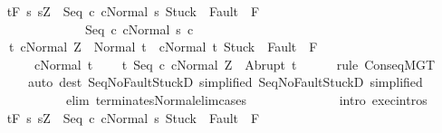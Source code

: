 \begin{isabellebody}
\ \ \isamarkupfalse%
\ {\isachardoublequoteopen}{\isasymGamma}{\isacharcomma}{\isasymTheta}{\isasymturnstile}\isactrlsub t\isactrlbsub {\isacharslash}F\isactrlesub \ {\isacharbraceleft}s{\isachardot}\ s{\isacharequal}Z\ {\isasymand}\ {\isasymGamma}{\isasymturnstile}{\isasymlangle}Seq\ c{}\ c{}{\isacharcomma}Normal\ s{\isasymrangle}\ {\isasymRightarrow}{\isasymnotin}{\isacharparenleft}{\isacharbraceleft}Stuck{\isacharbraceright}\ {\isasymunion}\ Fault\ {\isacharbackquote}\ {\isacharparenleft}{\isacharminus}F{\isacharparenright}{\isacharparenright}\ {\isasymand}\ \isanewline
\ \ \ \ \ \ \ \ \ \ \ \ \ \ \ \ {\isasymGamma}{\isasymturnstile}Seq\ c{}\ c{}{\isasymdown}Normal\ s{\isacharbraceright}\ c{}\ \isanewline
\ \ \ \ {\isacharbraceleft}t{\isachardot}\ {\isasymGamma}{\isasymturnstile}{\isasymlangle}c{}{\isacharcomma}Normal\ Z{\isasymrangle}\ {\isasymRightarrow}\ Normal\ t\ {\isasymand}\ {\isasymGamma}{\isasymturnstile}{\isasymlangle}c{}{\isacharcomma}Normal\ t{\isasymrangle}\ {\isasymRightarrow}{\isasymnotin}{\isacharparenleft}{\isacharbraceleft}Stuck{\isacharbraceright}\ {\isasymunion}\ Fault\ {\isacharbackquote}\ {\isacharparenleft}{\isacharminus}F{\isacharparenright}{\isacharparenright}\ {\isasymand}\ \isanewline
\ \ \ \ \ \ \ \ {\isasymGamma}{\isasymturnstile}c{}{\isasymdown}Normal\ t{\isacharbraceright}{\isacharcomma}\isanewline
\ \ \ \ {\isacharbraceleft}t{\isachardot}\ {\isasymGamma}{\isasymturnstile}{\isasymlangle}Seq\ c{}\ c{}{\isacharcomma}Normal\ Z{\isasymrangle}\ {\isasymRightarrow}\ Abrupt\ t{\isacharbraceright}{\isachardoublequoteclose}\isanewline
\ \ \ \ \isamarkupfalse%
\ {\isacharparenleft}rule\ ConseqMGT{\isacharparenright}\isanewline
\ \ \ \ \ \ \ {\isacharparenleft}auto\ dest{\isacharcolon}\ Seq{\isacharunderscore}NoFaultStuckD{}\ {\isacharbrackleft}simplified{\isacharbrackright}\ Seq{\isacharunderscore}NoFaultStuckD{}\ {\isacharbrackleft}simplified{\isacharbrackright}\isanewline
\ \ \ \ \ \ \ \ \ \ \ \ \ elim{\isacharcolon}\ terminates{\isacharunderscore}Normal{\isacharunderscore}elim{\isacharunderscore}cases\ \isanewline
\ \ \ \ \ \ \ \ \ \ \ \ \ intro{\isacharcolon}\ exec{\isachardot}intros{\isacharparenright}\isanewline
\ \ \isamarkupfalse%
\ {\isachardoublequoteopen}{\isasymGamma}{\isacharcomma}{\isasymTheta}{\isasymturnstile}\isactrlsub t\isactrlbsub {\isacharslash}F\isactrlesub \ {\isacharbraceleft}s{\isachardot}\ s{\isacharequal}Z\ {\isasymand}\ {\isasymGamma}{\isasymturnstile}{\isasymlangle}Seq\ c{}\ c{}{\isacharcomma}Normal\ s{\isasymrangle}\ {\isasymRightarrow}{\isasymnotin}{\isacharparenleft}{\isacharbraceleft}Stuck{\isacharbraceright}\ {\isasymunion}\ Fault\ {\isacharbackquote}\ {\isacharparenleft}{\isacharminus}F{\isacharparenright}{\isacharparenright}\ {\isasymand}\isanewline

\end{isabellebody}
